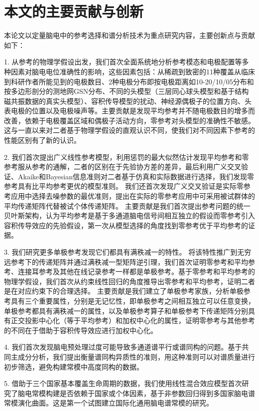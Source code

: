 \section{本文的主要贡献与创新}
本论文以定量脑电中的参考选择和谱分析技术为重点研究内容，主要创新点与贡献如下：

1. 从参考的物理学假设出发，我们首次全面系统地分析参考模态和电极配置等多种因素对脑电电位准确性的影响，这些因素包括：从稀疏到致密的11种覆盖从临床到科研作者所能见到的电极数目、2种电极分布即按电极距离如10-20/10/05分布和按多边形剖分的测地网GSN分布、不同的头模型（三层同心球头模型和基于结构磁共振数据的真实头模型）、容积传导模型的扰动、神经源偶极子的位置方向、头表电极的位置以及电极噪声等。主要贡献是发现平均参考并不随电极数目的增多而改善，依赖于电极覆盖区域和偶极子活动方向，零参考对头模型的准确性不敏感。这与一直以来对二者基于物理学假设的直观认识不同，使我们对不同因素下参考的性能区别有了新的认识。

2. 我们首次提出广义线性参考模型，利用惩罚的最大似然估计发现平均参考和零参考服从参考的通解，二者的区别在于先验协方差的差异，最后利用广义交叉验证、Akaike和Bayesian信息准则对二者基于仿真和实际数据进行选择，我们发现零参考具有比平均参考更优的模型准则。 我们还首次发现广义交叉验证是实际零参考应用中选择去噪参数的最优准则，提出在实际的零参考应用中可采用被试群体的平均传递矩阵代替被试个体传递矩阵。 主要贡献是我们首次提出参考问题的统一贝叶斯架构，认为平均参考是基于多通道脑电信号间相互独立的假设而零参考引入容积传导效应的先验假设，第一次从模型选择的角度找到零参考优于平均参考的证据。

3. 我们研究更多单极参考发现它们都具有满秩减一的特性。 将该特性推广到无穷远参考下的传递矩阵并通过满秩减一型矩阵逆引理，我们首次证明零参考和平均参考、连接耳参考及其他在线记录参考一样都是单极参考。基于零参考和平均参考的物理学假设，我们首次从约束线性回归的角度推导出零参考和平均参考，证明二者是在对应约束下的合理选择。 主要贡献是我们建立了单极参考家族，分析单极参考具有三个重要属性，分别是无记忆性，即单极参考之间相互独立可以任意变换，单极参考都具有满秩减一的属性，以及单极参考算子和单极参考下传递矩阵分别具有正交投影中心化（等于平均参考）和加权中心化的属性，证明零参考与其他参考的不同在于借助于容积传导效应进行加权中心化。

4. 我们首次发现脑电预处理过度可能导致多通道谱平行或谱同构的问题。基于共同主成分分析，我们提出衡量谱同构异质性的准则，用这种准则可以对谱质量进行初步筛选，避免构建常模中高度同构的数据。

5. 借助于三个国家基本覆盖生命周期的数据，我们使用线性混合效应模型首次研究了脑电常模构建是否依赖于国家或个体因素，基于非参数回归得到多国家脑电谱常模演化曲面。这是第一个试图建立国际化通用脑电谱常模的研究。

